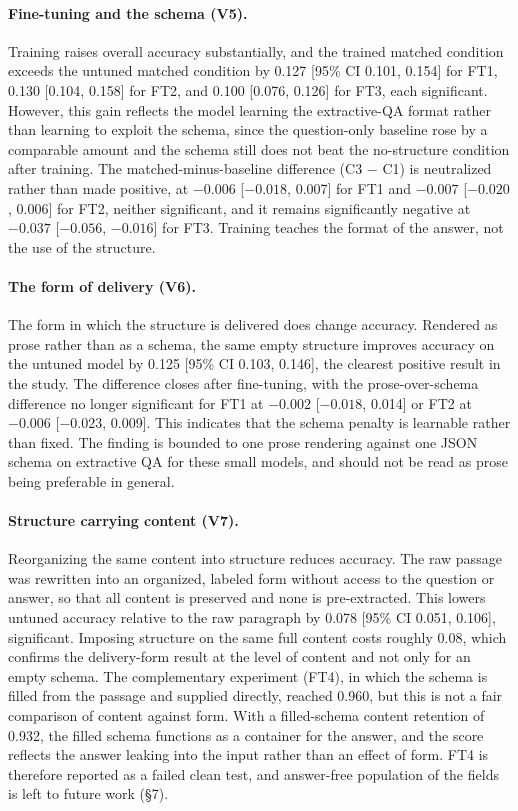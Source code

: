 \documentclass{article}
\begin{document}
\paragraph{Fine-tuning and the schema (V5).}
Training raises overall accuracy substantially, and the trained matched condition exceeds the untuned matched condition by 0.127 [95\% CI 0.101, 0.154] for FT1, 0.130 [0.104, 0.158] for FT2, and 0.100 [0.076, 0.126] for FT3, each significant. However, this gain reflects the model learning the extractive-QA format rather than learning to exploit the schema, since the question-only baseline rose by a comparable amount and the schema still does not beat the no-structure condition after training. The matched-minus-baseline difference (C3 $-$ C1) is neutralized rather than made positive, at $-0.006$ [$-0.018$, 0.007] for FT1 and $-0.007$ [$-0.020$, 0.006] for FT2, neither significant, and it remains significantly negative at $-0.037$ [$-0.056$, $-0.016$] for FT3. Training teaches the format of the answer, not the use of the structure.

\paragraph{The form of delivery (V6).}
The form in which the structure is delivered does change accuracy. Rendered as prose rather than as a schema, the same empty structure improves accuracy on the untuned model by 0.125 [95\% CI 0.103, 0.146], the clearest positive result in the study. The difference closes after fine-tuning, with the prose-over-schema difference no longer significant for FT1 at $-0.002$ [$-0.018$, 0.014] or FT2 at $-0.006$ [$-0.023$, 0.009]. This indicates that the schema penalty is learnable rather than fixed. The finding is bounded to one prose rendering against one JSON schema on extractive QA for these small models, and should not be read as prose being preferable in general.

\paragraph{Structure carrying content (V7).}
Reorganizing the same content into structure reduces accuracy. The raw passage was rewritten into an organized, labeled form without access to the question or answer, so that all content is preserved and none is pre-extracted. This lowers untuned accuracy relative to the raw paragraph by 0.078 [95\% CI 0.051, 0.106], significant. Imposing structure on the same full content costs roughly 0.08, which confirms the delivery-form result at the level of content and not only for an empty schema. The complementary experiment (FT4), in which the schema is filled from the passage and supplied directly, reached 0.960, but this is not a fair comparison of content against form. With a filled-schema content retention of 0.932, the filled schema functions as a container for the answer, and the score reflects the answer leaking into the input rather than an effect of form. FT4 is therefore reported as a failed clean test, and answer-free population of the fields is left to future work (\S7).
\end{document}
